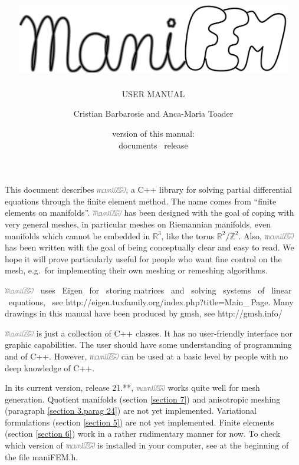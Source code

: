 \documentclass[a4paper]{scrreprt}
\title{\includegraphics[width=12cm]{manifem-grey-capital.eps}}
\subtitle{USER MANUAL}
\author{Cristian Barbarosie and Anca-Maria Toader}
\date{\small version of this manual: \manualversion\\ documents \maniFEM\ release \manifemrelease}
\def\manifemrelease{21.**}
\def\numb{}
\newcommand\ManiFEM{\leavevmode\hbox{\includegraphics[width=13mm]{manifem-large}}}
\newcommand\maniFEM{\leavevmode\hbox{\includegraphics[width=13mm]{manifem-small}}}
\renewcommand\tt{\normalfont\ttfamily}
\begin{document}
\begin{titlepage}
\maketitle
\end{titlepage}


\chapter*{}

This document describes \maniFEM, a {\tt C++} library for solving partial differential equations
through the finite element method.
The name comes from ``finite elements on manifolds''. 
{\ManiFEM} has been designed with the goal of coping with very general meshes,
in particular meshes on Riemannian manifolds, even manifolds which cannot be embedded
in $ {\mathbb R}^3 $, like the torus $ {\mathbb R}^2/{\mathbb Z}^2 $.
Also, {\maniFEM} has been written with the goal of being conceptually clear
and easy to read.
We hope it will prove particularly useful for people who want fine control on the mesh,
e.g.\ for implementing their own meshing or remeshing algorithms.

{\ManiFEM} \ uses \ {\tt Eigen} \ for \ storing matrices \ and \ solving \ systems \ of
\ linear \ equations, \ see {\small\tt http://eigen.tuxfamily.org/index.php?title=Main\_\,Page}.
Many drawings in this manual have been produced by {\tt gmsh}, see
{\small\tt http://gmsh.info/}

{\ManiFEM} is just a collection of {\tt C++} classes.
It has no user-friendly interface nor graphic capabilities.
The user should have some understanding of programming and of {\tt C++}.
However, {\maniFEM} can be used at a basic level by people with no deep knowledge of
{\tt C++}.

In its current version, release \manifemrelease, {\maniFEM} works quite well for mesh generation.
Quotient manifolds (section \ref{\numb section 7}) and anisotropic meshing (paragraph
\ref{\numb section 3.\numb parag 24}) are not yet implemented.
Variational formulations (section \ref{\numb section 5}) are not yet implemented.
Finite elements (section \ref{\numb section 6}) work in a rather rudimentary manner for now.
To check which version of {\maniFEM} is installed in your computer,
see at the beginning of the file {\small\tt maniFEM.h}.
\end{document}
